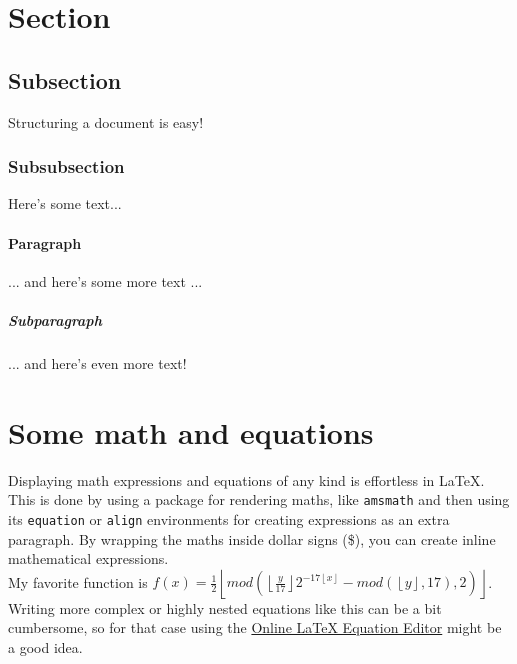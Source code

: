 \documentclass{article}
\begin{document}
\doublespacing          %

\maketitle
\newpage

\tableofcontents
\newpage

\listoffigures
\newpage

\listoftables
\newpage

\singlespacing

\section{Section}

\HelloWorld

\subsection{Subsection}

Structuring a document is easy!

\subsubsection{Subsubsection}

Here's some text...

\paragraph{Paragraph}

... and here's some more text ...

\subparagraph{Subparagraph}

... and here's even more text!

\section{Some math and equations}

Displaying math expressions and equations of any kind is effortless in \LaTeX.
This is done by using a package for rendering maths, like \texttt{amsmath} and
then using its \texttt{equation} or \texttt{align} environments for creating
expressions as an extra paragraph. By wrapping the maths inside dollar signs
(\$), you can create inline mathematical expressions. \\
My favorite function is
$f(x) = \frac{1}{2} \left\lfloor
    mod\left(
        \left\lfloor \frac{y}{17} \right\rfloor
        2^{-17\left\lfloor x \right\rfloor} -
        mod\left( \left\lfloor y \right\rfloor, 17 \right), 2
    \right)
\right\rfloor$. \\
Writing more complex or highly nested equations like this can be a bit
cumbersome, so for that case using the
\href{https://latexeditor.lagrida.com/} {Online LaTeX Equation Editor}
might be a good idea.
\end{document}
